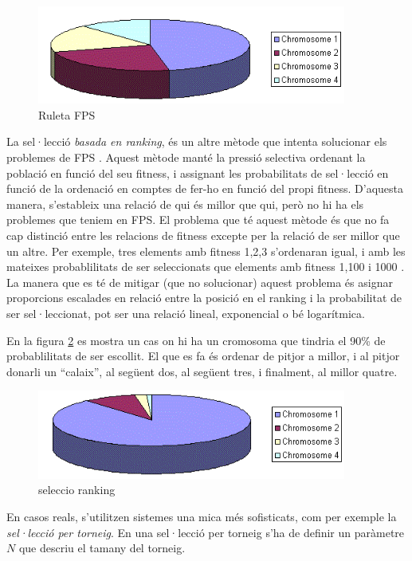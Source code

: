 \begin{figure} \centering \includegraphics[width=4in]{intro/rwsgraph.png}
\caption{\label{fig:rwsgraph}Ruleta FPS}
\end{figure}

La sel·lecció \emph{basada en ranking}, és un altre mètode que intenta
solucionar els problemes de FPS \cite{B87a}.  Aquest mètode manté la pressió
selectiva ordenant la població en funció del seu fitness, i assignant les
probabilitats de sel·lecció en funció de la ordenació en comptes de fer-ho en
funció del propi fitness. D'aquesta manera, s'estableix una relació de qui és
millor que qui, però no hi ha els problemes que teniem en FPS.  El problema que
té aquest mètode és que no fa cap distinció entre les relacions de fitness
excepte per la relació de ser millor que un altre.  Per exemple, tres elements
amb fitness 1,2,3 s'ordenaran igual, i amb les mateixes probablilitats de ser
seleccionats que elements amb fitness 1,100 i 1000 .  La manera que es té de
mitigar (que no solucionar) aquest problema és asignar proporcions escalades en
relació entre la posició en el ranking i la probabilitat de ser sel·leccionat,
pot ser una relació lineal, exponencial o bé logarítmica. 

En la figura \ref{fig:rank1} es mostra  un cas on hi ha un cromosoma que tindria
el 90\% de probablilitats de ser escollit. El que es fa és ordenar de pitjor a
millor, i al pitjor donarli un ``calaix'', al següent dos, al següent tres, i
finalment, al millor quatre. 

\begin{figure} \centering \includegraphics[width=4in]{intro/rank1.png}
\caption{\label{fig:rank1}seleccio ranking}
\end{figure}

En casos reals, s'utilitzen sistemes una mica més sofisticats, com per exemple
la \emph{sel·lecció per torneig}.  En una sel·lecció per torneig s'ha de definir
un paràmetre $N$ que descriu el tamany del torneig.

